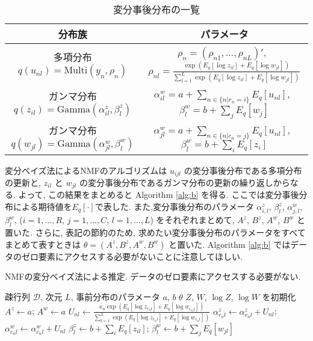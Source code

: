 \documentclass[paper=a4,10.5pt]{jsarticle} %
\numberwithin{equation}{section} %
\begin{document}
\renewcommand{\arraystretch}{1.6}
\begin{table}
\centering
\caption{変分事後分布の一覧} \label{post1}
\begin{tabular}{cc}
\hline
分布族 & パラメータ\\
\hline
多項分布 $q(u_{nl}) = \mathrm{Multi}(y_n, \rho_n)$ & $\rho_n = (\rho_{n1},\dots, \rho_{nL})'$,~ $\displaystyle \rho_{nl} = \frac{\exp(E_q[\log z_{il}] + E_q[\log w_{jl}] )}{ \sum_{l=1}^L \exp(E_q[\log z_{il}] + E_q[\log w_{jl}] )}$\\
ガンマ分布 $q(z_{il}) = \mathrm{Gamma}(\alpha^z_{il}, \beta^z_l)$ & $\displaystyle \alpha^w_{il}=a+\sum_{n \in \{n|r_n=i\}} E_q[u_{nl}]$,~ $\displaystyle \beta^w_{l} = b+\sum_j E_q[w_j]$\\
ガンマ分布 $q(w_{jl}) = \mathrm{Gamma}(\alpha^w_{jl}, \beta^w_{l})$ & $\displaystyle \alpha^w_{jl}=a+\sum_{n \in \{n|c_n=j\}} E_q[u_{nl}]$,~ $\displaystyle \beta^w_{l} = b+\sum_i E_q[z_i]$ \\
\hline
\end{tabular}
\end{table}
\renewcommand{\arraystretch}{1}

変分ベイズ法によるNMFのアルゴリズムは $u_{ijl}$ の変分事後分布である多項分布の更新と, $z_{il}$ と $w_{jl}$ の変分事後分布であるガンマ分布の更新の繰り返しからなる. よって, この結果をまとめると Algorithm \ref{alg:b} を得る. ここでは変分事後分布による期待値を$E_q[\cdot]$で表した. また,変分事後分布のパラメータ $\alpha^z_{i,l}$, $\beta^z_{l}$, $\alpha^w_{j,l}$, $\beta^w_{l}$, ($i=1,\ldots, R$, $j=1,\ldots, C$, $l=1, \ldots ,L$) をそれぞれまとめて, $A^z$, $B^z$, $A^w$, $B^w$ と置いた. さらに, 表記の節約のため, 求めたい変分事後分布のパラメータをすべてまとめて表すときは $\theta = (A^z, B^z, A^w, B^w)$ と置いた. Algorithm \ref{alg:b} ではデータのゼロ要素にアクセスする必要がないことに注意してほしい.

\begin{algorithm}[tbp]
\caption{NMFの変分ベイズ法による推定. データのゼロ要素にアクセスする必要がない. }\label{alg:b}
\begin{algorithmic}
\Require \Require 疎行列 $\mathcal{D}$, 次元 $L$, 事前分布のパラメータ $a$, $b$
\Ensure $\theta$ 
\State $Z$, $W$, $\log Z$, $\log W$ を初期化  
\State $A^z \leftarrow  a$; $A^w \leftarrow a$  
 
    \State $\displaystyle U_{nl} \leftarrow  \frac{x_n \exp(E_q[\log z_{r_nl}] + E_q[ \log w_{c_n j}] )}{ \sum_{l=1}^L \exp(E_q[\log z_{r_nl}]+E_q[\log w_{c_n l}] )}$  
    \State $\alpha^z_{r_n l}  \leftarrow \alpha^z_{r_nl} + U_{nl}$;  $\alpha^w_{c_n l} \leftarrow  \alpha^w_{c_n l}+ U_{nl}$ 
\EndFor
    \EndFor
    \State $\beta^z_{l}  \leftarrow  b +  \sum_i E_q[z_{il}]$; $\beta^w_{l}  \leftarrow b + \sum_j E_q[w_{jl}]$
        \EndFor
\EndWhile
\end{algorithmic}
\end{algorithm}
\end{document}

